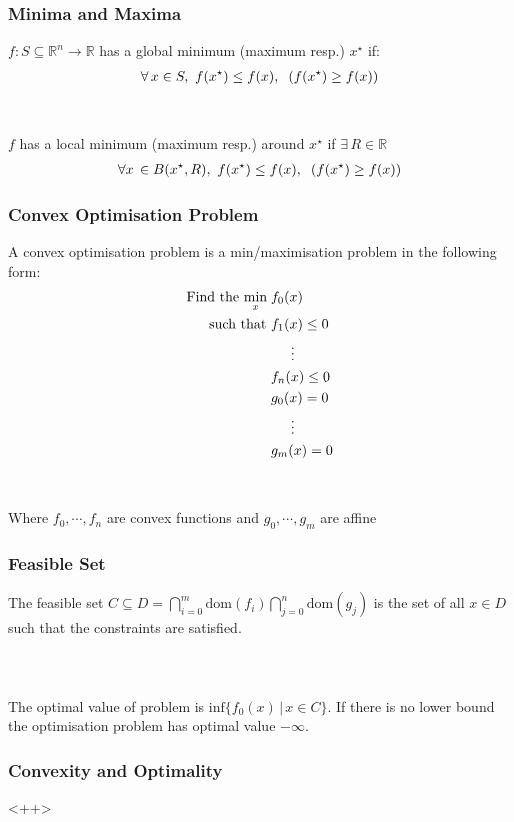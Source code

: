 \documentclass{beamer}
\def\rnum{\mathbb{R}}
\begin{document}
\begin{frame}
    \frametitle{Minima and Maxima}
    $f: S \subseteq \rnum^{n} \rightarrow \rnum$ has a global minimum (maximum
    resp.) $x^{\star}$ if:
    \begin{align*}
        \forall \, x \in S, \, \, f(x^{\star}) \leq f(x), \hspace{2mm}  (f(x^{\star}) \geq f(x))
    \end{align*}
    \\~\\
    $f$ has a local minimum (maximum resp.) around $x^{\star}$ if $\exists \, R \in
     \rnum$ 
    \begin{align*}
        \forall x \, \in B(x^{\star}, R), \, \, f(x^{\star}) \leq f(x),
        \hspace{2mm} (f(x^{\star}) \geq f(x))
    \end{align*}
\end{frame}

\begin{frame}
    \frametitle{Convex Optimisation Problem}
    A convex optimisation problem is a min/maximisation problem in the following
    form:
    {\footnotesize
    \begin{align*}
        \text{Find the }\underset{x}{\text{min}}\; &f_{0}(x) \\
        \text{  such that }&f_{1}(x) \leq 0 \\
        & \hspace{5mm} \vdots \\
        &f_{n}(x) \leq 0 \\
        &g_{0}(x) = 0 \\
        &\hspace{5mm} \vdots \\
        &g_{m}(x) = 0
    \end{align*}}
    \\~\\
    Where $f_0,\cdots, f_n$ are convex functions and $g_0, \cdots, g_m$ are
    affine
\end{frame}

\begin{frame}
    \frametitle{Feasible Set}
    The feasible set $C \subseteq D =
    \bigcap\limits_{i=0}^{m}\text{dom}(f_{i})\bigcap\limits_{j=0}^{n}\text{dom}(g_{j})$
    is the set of all $x \in D$ such that the constraints are satisfied.
    \\~\\
    \\~\\
    The optimal value of problem is $\text{inf} \{f_{0}(x) \, | \, x
    \in C \}$. If there is no lower bound the optimisation problem has optimal
    value $-\infty$.
\end{frame}

\begin{frame}
    \frametitle{Convexity and Optimality}

\end{frame}<++>
\end{document}
